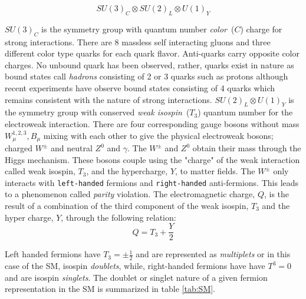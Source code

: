 \begin{equation}
SU(3)_{C} \otimes SU(2)_{L} \otimes U(1)_{Y}
\end{equation}

$SU(3)_{C}$ is the symmetry group with quantum number \textit{color}~($C$) charge for strong interactions. There are 8 massless self interacting gluons and three different color type quarks for each quark flavor.  Anti-quarks carry opposite color charges. No unbound quark has been observed, rather, quarks exist in nature as bound states call \textit{hadrons} consisting of 2 or 3 quarks such as protons although recent experiments have observe bound states consisting of 4 quarks which remains consistent with the nature of strong interactions.
\newline
 $SU(2)_{L} \otimes U(1)_{Y}$ is the symmetry group with conserved \textit{weak isospin}~($T_{3}$)  quantum number for the electroweak interaction. There are four corresponding gauge bosons without mass $W^{1,2,3}_{\mu}, B_{\mu} $  mixing with each other to give the physical electroweak bosons; charged $W^{\pm}$ and neutral $Z^{0}$ and $\gamma$. The $W^{\pm}$ and $Z^{0}$ obtain their mass through the Higgs mechanism. These bosons couple using the "charge" of the weak interaction called weak isospin, $T_{3}$, and the hypercharge, $Y$, to matter fields. The $W^{\pm}$ only interacts with \texttt{left-handed} fermions and \texttt{right-handed} anti-fermions. This leads to a phenomenon called \textit{parity} violation. The electromagnetic charge, $Q$, is the result of a combination of the third component of the weak isospin, $T_{3}$ and the hyper charge, $Y$, through the following relation:
\begin{equation}
Q = T_{3} + \frac{Y}{2}
\end{equation}

Left handed fermions have $T_{3} = \pm \frac{1}{2}$ and are represented as \textit{multiplets } or in this case of the SM, isospin \textit{doublets},  while, right-handed fermions have have $T^{3} = 0$ and are isospin \textit{singlets}. The doublet or singlet nature of a given fermion representation in the SM is summarized in table \ref{tab:SM}.



